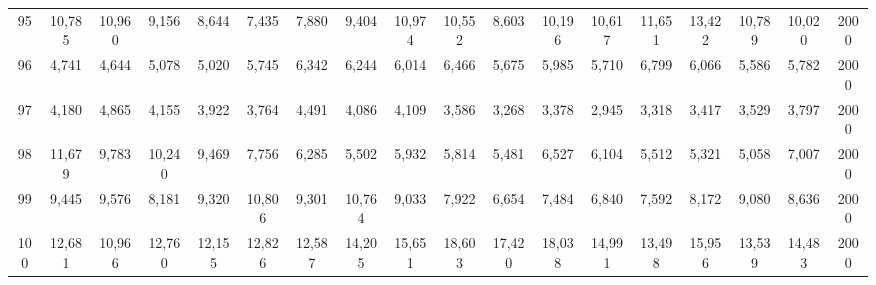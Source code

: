 {\begin{longtable}{ >{\tiny}cccccccccccccccccc}
95  & 10,785 & 10,960 & 9,156  & 8,644  & 7,435  & 7,880  & 9,404  & 10,974 & 10,552 & 8,603  & 10,196 & 10,617 & 11,651 & 13,422 & 10,789 & 10,020 & 2000 \\
96  & 4,741  & 4,644  & 5,078  & 5,020  & 5,745  & 6,342  & 6,244  & 6,014  & 6,466  & 5,675  & 5,985  & 5,710  & 6,799  & 6,066  & 5,586  & 5,782  & 2000 \\
97  & 4,180  & 4,865  & 4,155  & 3,922  & 3,764  & 4,491  & 4,086  & 4,109  & 3,586  & 3,268  & 3,378  & 2,945  & 3,318  & 3,417  & 3,529  & 3,797  & 2000 \\
98  & 11,679 & 9,783  & 10,240 & 9,469  & 7,756  & 6,285  & 5,502  & 5,932  & 5,814  & 5,481  & 6,527  & 6,104  & 5,512  & 5,321  & 5,058  & 7,007  & 2000 \\
99  & 9,445  & 9,576  & 8,181  & 9,320  & 10,806 & 9,301  & 10,764 & 9,033  & 7,922  & 6,654  & 7,484  & 6,840  & 7,592  & 8,172  & 9,080  & 8,636  & 2000 \\
100 & 12,681 & 10,966 & 12,760 & 12,155 & 12,826 & 12,587 & 14,205 & 15,651 & 18,603 & 17,420 & 18,038 & 14,991 & 13,498 & 15,956 & 13,539 & 14,483 & 2000  \\ \hline
\end{longtable}
}
